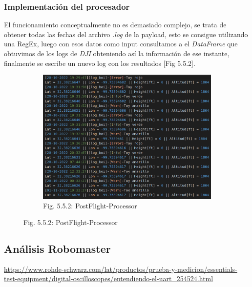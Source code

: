 \documentclass[12pt]{article}
\begin{document}
\subsubsection{Implementación del procesador}
El funcionamiento conceptualmente no es demasiado complejo, se trata de obtener todas las fechas del archivo \textit{.log} de la payload, esto se consigue utilizando una RegEx, luego con esos datos como input consultamos a el \textit{DataFrame} que obtuvimos de los logs de \textit{DJI} obteniendo así la información de ese instante, finalmente se escribe un nuevo log con los resultados [Fig 5.5.2].

\begin{figure}[ht]
  \centering
  \begin{subfigure}[a]{1\linewidth}
    \includegraphics[width=\linewidth]{images/post-flight-processor.png}
    \caption{Fig. 5.5.2: PostFlight-Processor}
  \end{subfigure}
\end{figure}

\subsection{Análisis Robomaster}

\newpage
\begin{thebibliography}{9}
 \url{https://www.rohde-schwarz.com/lat/productos/prueba-y-medicion/essentials-test-equipment/digital-oscilloscopes/entendiendo-el-uart_254524.html} 


\end{thebibliography}
\end{document}
